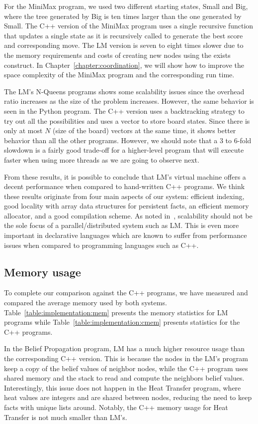 For the MiniMax program, we used two different starting states, Small and Big,
where the tree generated by Big is ten times larger than the one generated by
Small. The C++ version of the MiniMax program uses a single recursive function
that updates a single state as it is recursively called to generate the best
score and corresponding move. The LM version is seven to eight times slower due
to the memory requirements and costs of creating new nodes using the exists
construct. In Chapter~\ref{chapter:coordination}, we will show how to improve
the space complexity of the MiniMax program and the corresponding run time.

The LM's N-Queens programs shows some scalability issues since the overhead
ratio increases as the size of the problem increases. However, the same behavior
is seen in the Python program. The C++ version uses a backtracking strategy to
try out all the possibilities and uses a vector to store board states.  Since
there is only at most $N$ (size of the board) vectors at the same time, it shows
better behavior than all the other programs. However, we should note that a 3 to
6-fold slowdown is a fairly good trade-off for a higher-level program that will
execute faster when using more threads as we are going to observe next.

From these results, it is possible to conclude that LM's virtual machine offers
a decent performance when compared to hand-written C++ programs. We think these
results originate from four main aspects of our system: efficient indexing, good
locality with array data structures for persistent facts, an efficient memory
allocator, and a good compilation scheme. As noted in~\cite{cost}, scalability
should not be the sole focus of a parallel/distributed system such as LM. This
is even more important in declarative languages which are known to suffer from
performance issues when compared to programming languages such as C++.

\subsection{Memory usage}

To complete our comparison against the C++ programs, we have measured and
compared the average memory used by both systems.
Table~\ref{table:implementation:mem} presents the memory statistics for LM
programs while Table~\ref{table:implementation:cmem} presents statistics for the
C++ programs.

In the Belief Propagation program, LM has a much higher resource usage than the
corresponding C++ version. This is because the nodes in the LM's program keep a
copy of the belief values of neighbor nodes, while the C++ program uses shared
memory and the stack to read and compute the neighbors belief values.
Interestingly, this issue does not happen in the Heat Transfer program, where
heat values are integers and are shared between nodes, reducing the need to keep
facts with unique lists around. Notably, the C++ memory usage for Heat Transfer
is not much smaller than LM's.

